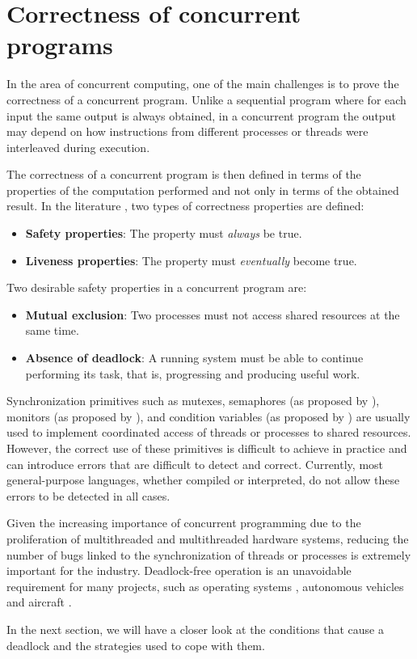 \section{Correctness of concurrent programs}

In the area of concurrent computing, one of the main challenges is
to prove the correctness of a concurrent program.
Unlike a sequential program where for each input the same output
is always obtained, in a concurrent program the output may depend
on how instructions from different processes or
threads were interleaved during execution.

The correctness of a concurrent program is then defined
in terms of the properties of the computation performed
and not only in terms of the obtained result.
In the literature \cite{ben-ari2006,coulouris2012,tanenbaum2017},
two types of correctness properties are defined:

\begin{itemize}
    \item \textbf{Safety properties}: The property must \emph{always} be true.
    \item \textbf{Liveness properties}: The property must \emph{eventually} become true.
\end{itemize}

Two desirable safety properties in a concurrent program are:

\begin{itemize}
    \item \textbf{Mutual exclusion}: Two processes must not access shared resources at the same time.
    \item \textbf{Absence of deadlock}: A running system must be able to continue performing its task,
          that is, progressing and producing useful work.
\end{itemize}

Synchronization primitives such as mutexes,
semaphores (as proposed by \cite{Dijkstra2002}),
monitors (as proposed by \cite{hansen1972structured,hansen1973operating}),
and condition variables (as proposed by \cite{hoare1974monitors}) are usually used
to implement coordinated access of threads or processes to shared resources.
However, the correct use of these primitives is difficult to achieve in practice
and can introduce errors that are difficult to detect and correct.
Currently, most general-purpose languages, whether compiled or interpreted,
do not allow these errors to be detected in all cases.

Given the increasing importance of concurrent programming due to the proliferation
of multithreaded and multithreaded hardware systems,
reducing the number of bugs linked to the synchronization of threads or processes
is extremely important for the industry.
Deadlock-free operation is an unavoidable requirement for many projects, such as
operating systems \cite{ArpaciDusseau2018}, autonomous vehicles \cite{Perronnet2019}
and aircraft \cite{carreno2005safety,monzon2009deadlock}.

In the next section, we will have a closer look at the conditions that cause a deadlock
and the strategies used to cope with them.